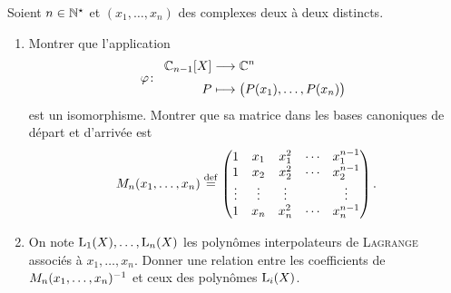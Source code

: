 \begin{exercice}
    Soient $n \in \mathbb{N}^\star$ et $(x_1, \dots, x_n)$ des complexes deux à deux distincts.
    \begin{enumerate}
        \item Montrer que l'application
        $$
        \fonction[\varphi]{\C_{n-1}[X]}{\C^n}{P}{\big( P(x_1), \dots, P(x_n) \big)}
        $$
        est un isomorphisme. Montrer que sa matrice dans les bases canoniques de départ et d'arrivée est 
        $$
        M_n(x_1, \dots, x_n) \overset{\mathrm{\tiny def}}{=}
        \begin{pmatrix}
            1 & x_1 & x_1^2 & \cdots & x_1^{n-1} \\
            1 & x_2 & x_2^2 & \cdots & x_2^{n-1} \\
            \vdots & \vdots & \vdots & & \vdots \\
            1 & x_n & x_n^2 & \cdots & x_n^{n-1}
        \end{pmatrix}.
        $$
        \item On note $\mathrm{L}_1(X), \dots, \mathrm{L}_n(X)$ les polynômes interpolateurs de \textsc{Lagrange} associés à $x_1, \dots, x_n$. Donner une relation entre les coefficients de $M_n(x_1, \dots, x_n)^{-1}$ et ceux des polynômes $\mathrm{L}_i(X)$.
    \end{enumerate}
\end{exercice}
